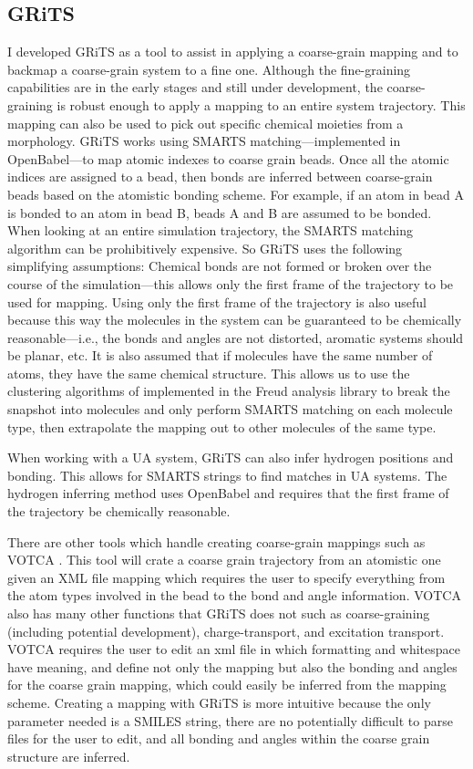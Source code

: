 \subsection{GRiTS}
I developed GRiTS as a tool to assist in applying a coarse-grain mapping and to backmap a coarse-grain system to a fine one. 
Although the fine-graining capabilities are in the early stages and still under development, the coarse-graining is robust enough to apply a mapping to an entire system trajectory. 
This mapping can also be used to pick out specific chemical moieties from a morphology. 
GRiTS works using SMARTS matching---implemented in OpenBabel---to map atomic indexes to coarse grain beads. 
Once all the atomic indices are assigned to a bead, then bonds are inferred between coarse-grain beads based on the atomistic bonding scheme. 
For example, if an atom in bead A is bonded to an atom in bead B, beads A and B are assumed to be bonded. 
When looking at an entire simulation trajectory, the SMARTS matching algorithm can be prohibitively expensive.
So GRiTS uses the following simplifying assumptions: Chemical bonds are not formed or broken over the course of the simulation---this allows only the first frame of the trajectory to be used for mapping. 
Using only the first frame of the trajectory is also useful because this way the molecules in the system can be guaranteed to be chemically reasonable---i.e., the bonds and angles are not distorted, aromatic systems should be planar, etc. 
It is also assumed that if molecules have the same number of atoms, they have the same chemical structure. 
This allows us to use the clustering algorithms of implemented in the Freud analysis library to break the snapshot into molecules and only perform SMARTS matching on each molecule type, then extrapolate the mapping out to other molecules of the same type.

When working with a UA system, GRiTS can also infer hydrogen positions and bonding. This allows for SMARTS strings to find matches in UA systems. The hydrogen inferring method uses OpenBabel and requires that the first frame of the trajectory be chemically reasonable.

There are other tools which handle creating coarse-grain mappings such as VOTCA \citep{Ruhle2009}. 
This tool will crate a coarse grain trajectory from an atomistic one given an XML file mapping which requires the user to specify everything from the atom types involved in the bead to the bond and angle information.
VOTCA also has many other functions that GRiTS does not such as coarse-graining (including potential development), charge-transport, and excitation transport.
VOTCA requires the user to edit an xml file in which formatting and whitespace have meaning, and define not only the mapping but also the bonding and angles for the coarse grain mapping, which could easily be inferred from the mapping scheme.
Creating a mapping with GRiTS is more intuitive because the only parameter needed is a SMILES string, there are no potentially difficult to parse files for the user to edit, and all bonding and angles within the coarse grain structure are inferred.

